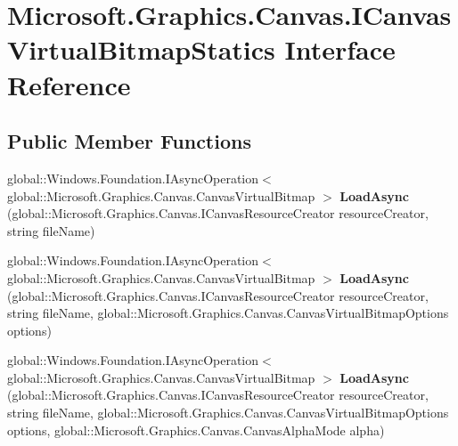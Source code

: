 \hypertarget{interface_microsoft_1_1_graphics_1_1_canvas_1_1_i_canvas_virtual_bitmap_statics}{}\section{Microsoft.\+Graphics.\+Canvas.\+I\+Canvas\+Virtual\+Bitmap\+Statics Interface Reference}
\label{interface_microsoft_1_1_graphics_1_1_canvas_1_1_i_canvas_virtual_bitmap_statics}
\subsection*{Public Member Functions}
\begin{DoxyCompactItemize}
\item 
\mbox{\label{interface_microsoft_1_1_graphics_1_1_canvas_1_1_i_canvas_virtual_bitmap_statics_a330ce31be0bdb0b0a0d703fabfad4773}} 
global\+::\+Windows.\+Foundation.\+I\+Async\+Operation$<$ global\+::\+Microsoft.\+Graphics.\+Canvas.\+Canvas\+Virtual\+Bitmap $>$ {\bfseries Load\+Async} (global\+::\+Microsoft.\+Graphics.\+Canvas.\+I\+Canvas\+Resource\+Creator resource\+Creator, string file\+Name)
\item 
\mbox{\label{interface_microsoft_1_1_graphics_1_1_canvas_1_1_i_canvas_virtual_bitmap_statics_a76a39d531ac6da083f15563d74ccbb82}} 
global\+::\+Windows.\+Foundation.\+I\+Async\+Operation$<$ global\+::\+Microsoft.\+Graphics.\+Canvas.\+Canvas\+Virtual\+Bitmap $>$ {\bfseries Load\+Async} (global\+::\+Microsoft.\+Graphics.\+Canvas.\+I\+Canvas\+Resource\+Creator resource\+Creator, string file\+Name, global\+::\+Microsoft.\+Graphics.\+Canvas.\+Canvas\+Virtual\+Bitmap\+Options options)
\item 
\mbox{\label{interface_microsoft_1_1_graphics_1_1_canvas_1_1_i_canvas_virtual_bitmap_statics_af2af584f62356eb886a700899215d4a6}} 
global\+::\+Windows.\+Foundation.\+I\+Async\+Operation$<$ global\+::\+Microsoft.\+Graphics.\+Canvas.\+Canvas\+Virtual\+Bitmap $>$ {\bfseries Load\+Async} (global\+::\+Microsoft.\+Graphics.\+Canvas.\+I\+Canvas\+Resource\+Creator resource\+Creator, string file\+Name, global\+::\+Microsoft.\+Graphics.\+Canvas.\+Canvas\+Virtual\+Bitmap\+Options options, global\+::\+Microsoft.\+Graphics.\+Canvas.\+Canvas\+Alpha\+Mode alpha)

\end{DoxyCompactItemize}
